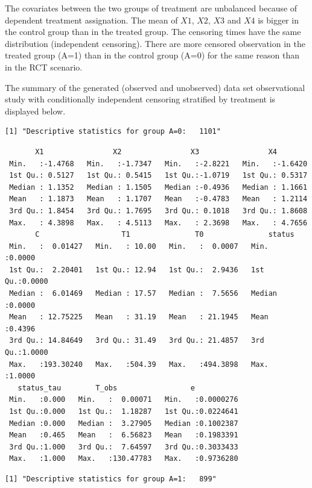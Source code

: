 \documentclass[
  11pt,
  a4paper,
]{article}
\theoremstyle{plain}
\theoremstyle{plain}
\theoremstyle{plain}
\theoremstyle{definition}
\theoremstyle{remark}
\begin{document}
The covariates between the two groups of treatment are unbalanced
because of dependent treatment assignation. The mean of \(X1\), \(X2\),
\(X3\) and \(X4\) is bigger in the control group than in the treated
group. The censoring times have the same distribution (independent
censoring). There are more censored observation in the treated group
(A=1) than in the control group (A=0) for the same reason than in the
RCT scenario.

The summary of the generated (observed and unobserved) data set
observational study with conditionally independent censoring stratified
by treatment is displayed below.

\begin{verbatim}
[1] "Descriptive statistics for group A=0:   1101"
\end{verbatim}

\begin{verbatim}
       X1                X2                X3                X4         
 Min.   :-1.4768   Min.   :-1.7347   Min.   :-2.8221   Min.   :-1.6420  
 1st Qu.: 0.5127   1st Qu.: 0.5415   1st Qu.:-1.0719   1st Qu.: 0.5317  
 Median : 1.1352   Median : 1.1505   Median :-0.4936   Median : 1.1661  
 Mean   : 1.1873   Mean   : 1.1707   Mean   :-0.4783   Mean   : 1.2114  
 3rd Qu.: 1.8454   3rd Qu.: 1.7695   3rd Qu.: 0.1018   3rd Qu.: 1.8608  
 Max.   : 4.3898   Max.   : 4.5113   Max.   : 2.3698   Max.   : 4.7656  
       C                   T1               T0               status      
 Min.   :  0.01427   Min.   : 10.00   Min.   :  0.0007   Min.   :0.0000  
 1st Qu.:  2.20401   1st Qu.: 12.94   1st Qu.:  2.9436   1st Qu.:0.0000  
 Median :  6.01469   Median : 17.57   Median :  7.5656   Median :0.0000  
 Mean   : 12.75225   Mean   : 31.19   Mean   : 21.1945   Mean   :0.4396  
 3rd Qu.: 14.84649   3rd Qu.: 31.49   3rd Qu.: 21.4857   3rd Qu.:1.0000  
 Max.   :193.30240   Max.   :504.39   Max.   :494.3898   Max.   :1.0000  
   status_tau        T_obs                 e            
 Min.   :0.000   Min.   :  0.00071   Min.   :0.0000276  
 1st Qu.:0.000   1st Qu.:  1.18287   1st Qu.:0.0224641  
 Median :0.000   Median :  3.27905   Median :0.1002387  
 Mean   :0.465   Mean   :  6.56823   Mean   :0.1983391  
 3rd Qu.:1.000   3rd Qu.:  7.64597   3rd Qu.:0.3033433  
 Max.   :1.000   Max.   :130.47783   Max.   :0.9736280  
\end{verbatim}

\begin{verbatim}
[1] "Descriptive statistics for group A=1:   899"
\end{verbatim}
\end{document}
